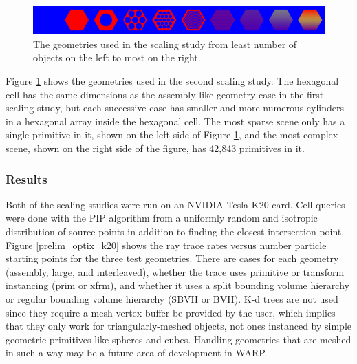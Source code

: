 \begin{figure}[h!] 
  \centering
    \includegraphics[width=1.0\textwidth]{graphics/prelim/prelim_scaling_geom.png}
     \caption{The geometries used in the scaling study from least number of objects on the left to most on the right. \label{prelim_scaling_geom} }
\end{figure}

Figure \ref{prelim_scaling_geom} shows the geometries used in the second scaling study.  The hexagonal cell has the same dimensions as the assembly-like geometry case in the first scaling study, but each successive case has smaller and more numerous cylinders in a hexagonal array inside the hexagonal cell.  The most sparse scene only has a single primitive in it, shown on the left side of Figure \ref{prelim_scaling_geom}, and the most complex scene, shown on the right side of the figure, has 42,843 primitives in it.

\subsubsection{Results}


Both of the scaling studies were run on an NVIDIA Tesla K20 card.  Cell queries were done with the PIP algorithm from a uniformly random and isotropic distribution of source points in addition to finding the closest intersection point.  Figure \ref{prelim_optix_k20} shows the ray trace rates versus number particle starting points for the three test geometries. There are cases for each geometry (assembly, large, and interleaved), whether the trace uses primitive or transform instancing (prim or xfrm), and whether it uses a split bounding volume hierarchy or regular bounding volume hierarchy (SBVH or BVH).  K-d trees are not used since they require a mesh vertex buffer be provided by the user, which implies that they only work for triangularly-meshed objects, not ones instanced by simple geometric primitives like spheres and cubes.  Handling geometries that are meshed in such a way may be a future area of development in WARP.

